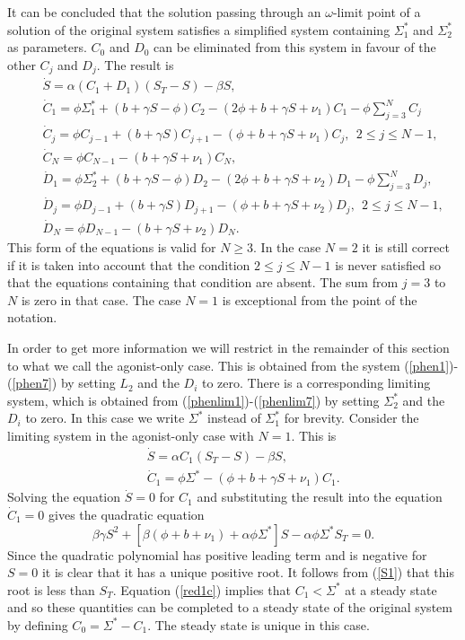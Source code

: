 \documentclass{article}
\begin{document}
It can be concluded that the solution passing through an $\omega$-limit point 
of a solution of the original system satisfies a simplified system containing 
$\Sigma_1^*$ and $\Sigma_2^*$ as parameters. $C_0$ and $D_0$ can be eliminated 
from this system in favour of the other $C_j$ and $D_j$. The result is
\begin{eqnarray}
&&\dot S=\alpha (C_1+D_1)(S_T-S)-\beta S,\label{phenlim1}\\
&&\dot C_1=\phi\Sigma_1^*+(b+\gamma S-\phi)C_2
-(2\phi+b+\gamma S+\nu_1)C_1-\phi\sum_{j=3}^N C_j\label{phenlim2}\\
&&\dot C_j=\phi C_{j-1}+(b+\gamma S)C_{j+1}-(\phi+b+\gamma S+\nu_1)C_j,
\ \ 2\le j\le N-1,\label{phenlim3}\\
&&\dot C_N=\phi C_{N-1}-(b+\gamma S+\nu_1)C_N,\label{phenlim4}\\
&&\dot D_1=\phi\Sigma_2^*+(b+\gamma S-\phi)D_2
-(2\phi+b+\gamma S+\nu_2)D_1-\phi\sum_{j=3}^N D_j,\label{phenlim5}\\
&&\dot D_j=\phi D_{j-1}+(b+\gamma S)D_{j+1}-(\phi+b+\gamma S+\nu_2)D_j,
\ \ 2\le j\le N-1,\label{phenlim6}\\
&&\dot D_N=\phi D_{N-1}-(b+\gamma S+\nu_2)D_N.\label{phenlim7}
\end{eqnarray}
This form of the equations is valid for $N\ge 3$. In the case $N=2$ it is still
correct if it is taken into account that the condition $2\le j\le N-1$ is never
satisfied so that the equations containing that condition are absent. The sum 
from $j=3$ to $N$ is zero in that case. The case $N=1$ is exceptional from the 
point of the notation.  

In order to get more information we will restrict in the remainder of this
section to what we call the agonist-only case. This is obtained from the system 
(\ref{phen1})-(\ref{phen7}) by setting $L_2$ and the $D_i$ to zero. There
is a corresponding limiting system, which is obtained from
(\ref{phenlim1})-(\ref{phenlim7}) by setting $\Sigma_2^*$ and the $D_i$ to
zero. In this case we write $\Sigma^*$ instead of $\Sigma_1^*$ for brevity.
Consider the limiting system in the agonist-only case with $N=1$. This is 
\begin{eqnarray}
&&\dot S=\alpha C_1 (S_T-S)-\beta S\label{red1s},\\
&&\dot C_1=\phi\Sigma^*-(\phi+b+\gamma S+\nu_1)C_1\label{red1c}.
\end{eqnarray}
Solving the equation $\dot S=0$ for $C_1$ and substituting the result
into the equation $\dot C_1=0$ gives the quadratic equation 
\begin{equation}\label{S1}
\beta\gamma S^2+[\beta (\phi+b+\nu_1)+\alpha\phi\Sigma^*]S
-\alpha\phi\Sigma^* S_T=0.
\end{equation}
Since the quadratic polynomial has positive leading term and is negative for 
$S=0$ it is clear that it has a unique positive root. It follows from
(\ref{S1}) that this root is less than $S_T$. Equation (\ref{red1c}) implies
that $C_1<\Sigma^*$ at a steady state and so these quantities can be completed 
to a steady state of the original system by defining $C_0=\Sigma^*-C_1$. The 
steady state is unique in this case.
\end{document}
